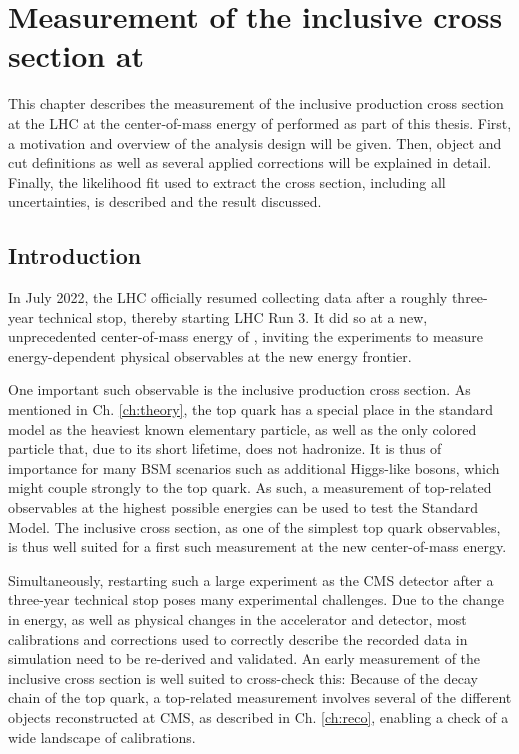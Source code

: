 \chapter{Measurement of the inclusive \ttbar cross section at \sqrtsRIII}
\label{ch:ttxs}

This chapter describes the measurement of the inclusive \ttbar production cross section at the LHC at the center-of-mass energy of \sqrtsRIII performed as part of this thesis. First, a motivation and overview of the analysis design will be given. Then, object and cut definitions as well as several applied corrections will be explained in detail. Finally, the likelihood fit used to extract the cross section, including all uncertainties, is described and the result discussed.

\section{Introduction}



In July 2022, the LHC officially resumed collecting data after a roughly three-year technical stop, thereby starting LHC Run 3. It did so at a new, unprecedented center-of-mass energy of \sqrtsRIII, inviting the experiments to measure energy-dependent physical observables at the new energy frontier.

One important such observable is the inclusive \ttbar production cross section. As mentioned in Ch. \ref{ch:theory}, the top quark has a special place in the standard model as the heaviest known elementary particle, as well as the only colored particle that, due to its short lifetime, does not hadronize. It is thus of importance for many BSM scenarios such as additional Higgs-like bosons, which might couple strongly to the top quark. As such, a measurement of top-related observables at the highest possible energies can be used to test the Standard Model. The inclusive \ttbar cross section, as one of the simplest top quark observables, is thus well suited for a first such measurement at the new center-of-mass energy.

Simultaneously, restarting such a large experiment as the CMS detector after a three-year technical stop poses many experimental challenges. Due to the change in energy, as well as physical changes in the accelerator and detector, most calibrations and corrections used to correctly describe the recorded data in simulation need to be re-derived and validated. An early measurement of the inclusive \ttbar cross section is well suited to cross-check this: Because of the decay chain of the top quark, a top-related measurement involves several of the different objects reconstructed at CMS, as described in Ch. \ref{ch:reco}, enabling a check of a wide landscape of calibrations.

